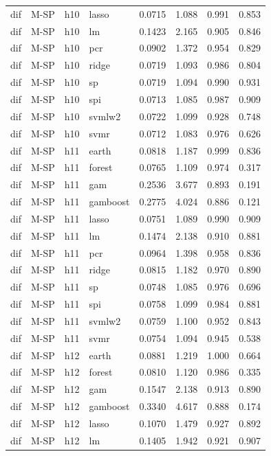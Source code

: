 \begin{ThreePartTable}
\begin{longtable}[t]{llclcccc}
dif & M-SP & h10 & lasso & 0.0715 & 1.088 & 0.991 & 0.853\\
dif & M-SP & h10 & lm & 0.1423 & 2.165 & 0.905 & 0.846\\
dif & M-SP & h10 & pcr & 0.0902 & 1.372 & 0.954 & 0.829\\
dif & M-SP & h10 & ridge & 0.0719 & 1.093 & 0.986 & 0.804\\
dif & M-SP & h10 & sp & 0.0719 & 1.094 & 0.990 & 0.931\\
dif & M-SP & h10 & spi & 0.0713 & 1.085 & 0.987 & 0.909\\
dif & M-SP & h10 & svmlw2 & 0.0722 & 1.099 & 0.928 & 0.748\\
dif & M-SP & h10 & svmr & 0.0712 & 1.083 & 0.976 & 0.626\\
\addlinespace
dif & M-SP & h11 & earth & 0.0818 & 1.187 & 0.999 & 0.836\\
dif & M-SP & h11 & forest & 0.0765 & 1.109 & 0.974 & 0.317\\
dif & M-SP & h11 & gam & 0.2536 & 3.677 & 0.893 & 0.191\\
dif & M-SP & h11 & gamboost & 0.2775 & 4.024 & 0.886 & 0.121\\
dif & M-SP & h11 & lasso & 0.0751 & 1.089 & 0.990 & 0.909\\
dif & M-SP & h11 & lm & 0.1474 & 2.138 & 0.910 & 0.881\\
dif & M-SP & h11 & pcr & 0.0964 & 1.398 & 0.958 & 0.836\\
dif & M-SP & h11 & ridge & 0.0815 & 1.182 & 0.970 & 0.890\\
dif & M-SP & h11 & sp & 0.0748 & 1.085 & 0.976 & 0.696\\
dif & M-SP & h11 & spi & 0.0758 & 1.099 & 0.984 & 0.881\\
dif & M-SP & h11 & svmlw2 & 0.0759 & 1.100 & 0.952 & 0.843\\
dif & M-SP & h11 & svmr & 0.0754 & 1.094 & 0.945 & 0.538\\
\addlinespace
dif & M-SP & h12 & earth & 0.0881 & 1.219 & 1.000 & 0.664\\
dif & M-SP & h12 & forest & 0.0810 & 1.120 & 0.986 & 0.335\\
dif & M-SP & h12 & gam & 0.1547 & 2.138 & 0.913 & 0.890\\
dif & M-SP & h12 & gamboost & 0.3340 & 4.617 & 0.888 & 0.174\\
dif & M-SP & h12 & lasso & 0.1070 & 1.479 & 0.927 & 0.892\\
dif & M-SP & h12 & lm & 0.1405 & 1.942 & 0.921 & 0.907\\

\end{longtable}
\end{ThreePartTable}
